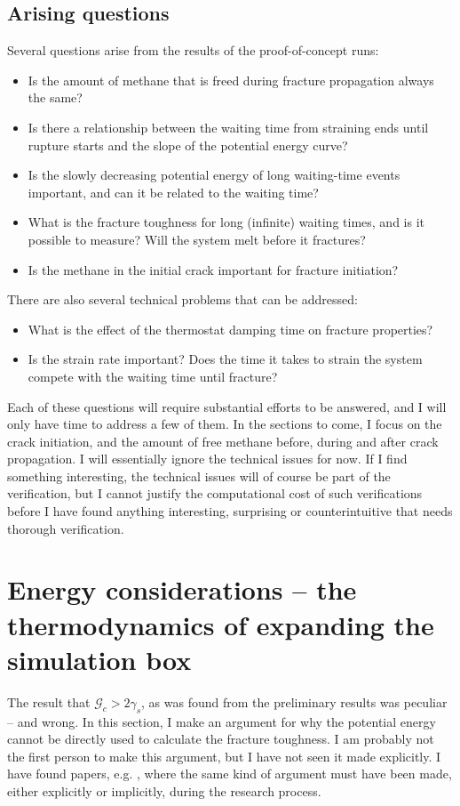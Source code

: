 \subsection{Arising questions}
Several questions arise from the results of the proof-of-concept runs:
\begin{itemize}
\item Is the amount of methane that is freed during fracture propagation always the same?
\item Is there a relationship between the waiting time from straining ends until rupture starts and the slope of the potential energy curve?
\item Is the slowly decreasing potential energy of long waiting-time events important, and can it be related to the waiting time?
\item What is the fracture toughness for long (infinite) waiting times, and is it possible to measure? Will the system melt before it fractures?
\item Is the methane in the initial crack important for fracture initiation?
\end{itemize}

There are also several technical problems that can be addressed:
\begin{itemize}
\item What is the effect of the thermostat damping time on fracture properties?
\item Is the strain rate important? Does the time it takes to strain the system compete with the waiting time until fracture?
\end{itemize}

Each of these questions will require substantial efforts to be answered, and I will only have time to address a few of them. In the sections to come, I focus on the crack initiation, and the amount of free methane before, during and after crack propagation. I will essentially ignore the technical issues for now. If I find something interesting, the technical issues will of course be part of the verification, but I cannot justify the computational cost of such verifications before I have found anything interesting, surprising or counterintuitive that needs thorough verification.

\section{Energy considerations -- the thermodynamics of expanding the simulation box}
\label{sec:energy_considerations}
The result that $\mathcal{G}_c > 2\gamma_s$, as was found from the preliminary results was peculiar -- and wrong. In this section, I make an argument for why the potential energy cannot be directly used to calculate the fracture toughness. I am probably not the first person to make this argument, but I have not seen it made explicitly. I have found papers, e.g. \citet{Hantal2014}, where the same kind of argument must have been made, either explicitly or implicitly, during the research process. 

